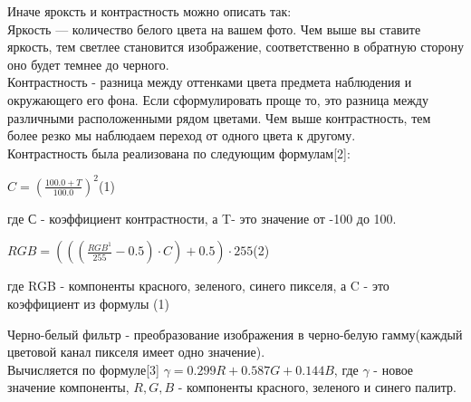 \documentclass[russian,a4paper,12pt]{scrartcl}
\begin{document}
			Иначе яроксть и контрастность можно описать так:\\
			Яркость — количество белого цвета на вашем фото. Чем выше вы ставите яркость, тем светлее становится изображение, соответственно в обратную сторону оно будет темнее до черного.\\
			Контрастность - разница между оттенками цвета предмета наблюдения и окружающего его фона. Если сформулировать проще то, это разница между различными расположенными рядом цветами. Чем выше контрастность, тем более резко мы наблюдаем переход от одного цвета к другому.\\
			
			Контрастность была реализована по следующим формулам[2]:\\
			\begin{center}
				$C=(\frac{100.0 + T}{100.0})^2$(1)
			\end{center}
			где С - коэффициент контрастности, а T- это значение от -100 до 100.
			\begin{center}
				$RGB = (((\frac{RGB^1}{255}-0.5)\cdot C)+0.5)\cdot 255$(2)
			\end{center}
			где RGB - компоненты красного, зеленого, синего пикселя, а C - это коэффициент из формулы (1)
		
			Черно-белый фильтр - преобразование изображения в черно-белую гамму(каждый цветовой канал пикселя имеет одно значение).\\
			Вычисляется по формуле[3] $\gamma = 0.299R + 0.587G + 0.144B$, где $\gamma$ - новое значение компоненты, $R, G, B$ - компоненты красного, зеленого и синего палитр.\\
\end{document}
